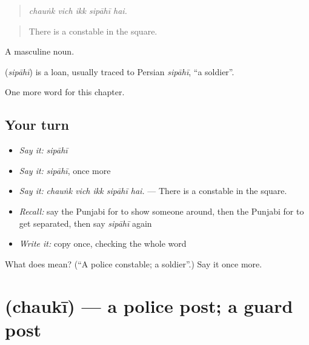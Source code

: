 \begin{quote}
    
\end{quote}

\begin{quote}
\emph{chauṅk vich ikk sipāhī hai.}
\end{quote}

\begin{quote}
There is a constable in the square.
\end{quote}

A masculine noun.

\begin{cousinweb}
\textbf{} (\emph{sipāhī}) is a loan, usually traced to Persian \emph{sipāhī}, \textquotedblleft{}a soldier\textquotedblright{}.
\end{cousinweb}

\begin{grammarlens}[title={What you've built}]
One more word for this chapter.
\end{grammarlens}

\subsection*{Your turn}
\begin{itemize}
\raggedright
  \item \emph{Say it:} \emph{sipāhī}
  \item \emph{Say it:} \emph{sipāhī}, once more
  \item \emph{Say it:} \emph{chauṅk vich ikk sipāhī hai.} — There is a constable in the square.
  \item \emph{Recall:} say the Punjabi for to show someone around, then the Punjabi for to get separated, then say \emph{sipāhī} again
  \item \emph{Write it:} copy \textbf{} once, checking the whole word
\end{itemize}

\begin{tcolorbox}[breakable,colback=teal!4,colframe=teal!35!black,title={Before you move on}]
What does  mean? (\textquotedblleft{}A police constable; a soldier\textquotedblright{}.) Say it once more.
\end{tcolorbox}
\section[\texorpdfstring{\pa{ਚੌਕੀ} (chaukī)}{ਚੌਕੀ (chaukī)}]{ (chaukī) — a police post; a guard post}

